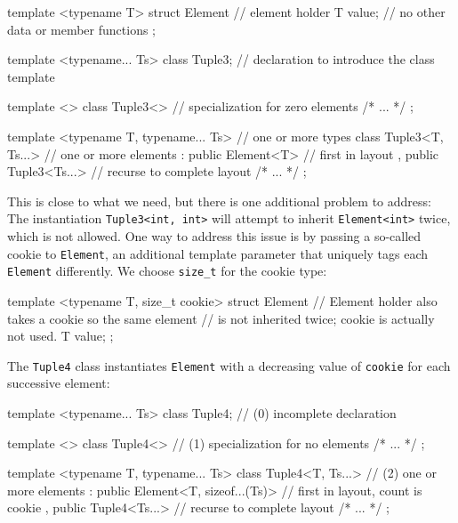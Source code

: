 \begin{emcppslisting}
template <typename T>
struct Element       // element holder
{
    T value;         // no other data or member functions
};

template <typename... Ts>
class Tuple3;        // declaration to introduce the class template

template <>
class Tuple3<>       // specialization for zero elements
{ /* ... */ };

template <typename T, typename... Ts>  // one or more types
class Tuple3<T, Ts...>                 // one or more elements
    : public Element<T>                // first in layout
    , public Tuple3<Ts...>             // recurse to complete layout
{ /* ... */ };
\end{emcppslisting}
    

\noindent This is close to what we need, but there is one additional problem to
address: The instantiation \lstinline!Tuple3<int,!~\lstinline!int>! will
attempt to inherit \lstinline!Element<int>! twice, which is not allowed.
One way to address this issue is by passing a so-called cookie to
\lstinline!Element!, an additional template parameter that uniquely tags
each \lstinline!Element! differently. We choose \lstinline!size_t! for the
cookie type:

\begin{emcppslisting}
template <typename T, size_t cookie>
struct Element       // Element holder also takes a cookie so the same element
                     // is not inherited twice; cookie is actually not used.
{
    T value;
};
\end{emcppslisting}
    

\noindent The \lstinline!Tuple4! class instantiates \lstinline!Element! with a
decreasing value of \lstinline!cookie! for each successive element:

\begin{emcppslisting}
template <typename... Ts>
class Tuple4;                            // (0) incomplete declaration

template <>
class Tuple4<>                           // (1) specialization for no elements
{ /* ... */ };

template <typename T, typename... Ts>
class Tuple4<T, Ts...>                   // (2) one or more elements
    : public Element<T, sizeof...(Ts)>   // first in layout, count is cookie
    , public Tuple4<Ts...>               // recurse to complete layout
{ /* ... */ };
\end{emcppslisting}
    

